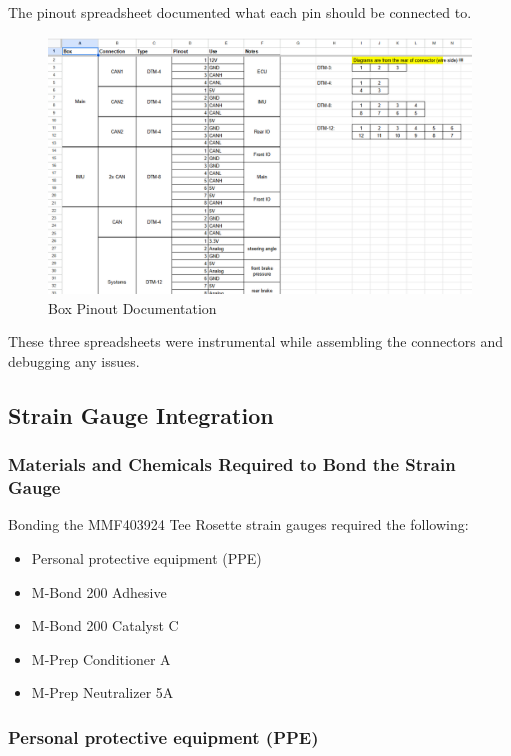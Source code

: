 The pinout spreadsheet documented what each pin should be connected to.
\begin{figure}[H]
        \centering
        \includegraphics[width=7in]{images/pinouts.png}
        \caption{Box Pinout Documentation}
        \label{fig:hghahhhh}
\end{figure}
These three spreadsheets were instrumental while assembling the connectors and debugging any issues.


\subsection{Strain Gauge Integration}
\subsubsection{Materials and Chemicals Required to Bond the Strain Gauge}
Bonding the MMF403924 Tee Rosette strain gauges required the following:
\begin{itemize}
    \item Personal protective equipment (PPE)
    \item M-Bond 200 Adhesive
    \item M-Bond 200 Catalyst C
    \item M-Prep Conditioner A
    \item M-Prep Neutralizer 5A
\end{itemize}

\subsubsection{Personal protective equipment (PPE)}

